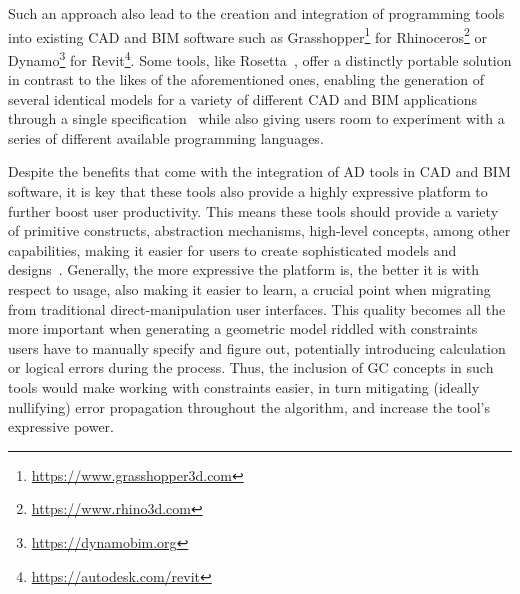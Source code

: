 Such an approach also lead to the creation and integration of programming tools
into existing \ac{CAD} and \ac{BIM} software such as
Grasshopper\footnote{\url{https://www.grasshopper3d.com}} for
Rhinoceros\footnote{\url{https://www.rhino3d.com}} or
Dynamo\footnote{\url{https://dynamobim.org}} for
Revit\footnote{\url{https://autodesk.com/revit}}.  Some tools, like
Rosetta~\cite{Leitao:2011:PGDCAD}, offer a distinctly portable solution in
contrast to the likes of the aforementioned ones, enabling the generation of
several identical models for a variety of different \ac{CAD} and \ac{BIM}
applications through a single specification~\cite{CasteloBranco:2017:IAD} while
also giving users room to experiment with a series of different available
programming languages.

Despite the benefits that come with the integration of \ac{AD} tools in \ac{CAD}
and \ac{BIM} software, it is key that these tools also provide a highly
expressive platform to further boost user productivity.  This means these tools
should provide a variety of primitive constructs, abstraction mechanisms,
high-level concepts, among other capabilities, making it easier for users to
create sophisticated models and designs~\cite{Leitao:2014:IGDAGHOP}.  Generally,
the more expressive the platform is, the better it is with respect to usage,
also making it easier to learn, a crucial point when migrating from traditional
direct-manipulation user interfaces.  This quality becomes all the more
important when generating a geometric model riddled with constraints users have
to manually specify and figure out, potentially introducing calculation or
logical errors during the process.  Thus, the inclusion of \ac{GC} concepts in
such tools would make working with constraints easier, in turn mitigating
(ideally nullifying) error propagation throughout the algorithm, and increase
the tool's expressive power.

